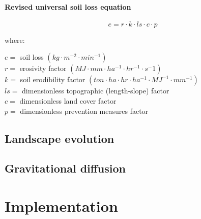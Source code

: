 \documentclass[final,3p,times,twocolumn]{elsarticle}
\begin{document}
\paragraph{Revised universal soil loss equation}
%
\begin{equation}
\label{eq:rusle}
{e = r \cdot k \cdot ls \cdot c \cdot p}
\end{equation}

\noindent
where: 

\noindent %
$e =$ soil loss $(kg \cdot m^{-2} \cdot min^{-1})$\\
$r =$ erosivity factor $(MJ \cdot mm \cdot ha^{-1} \cdot hr^{-1} \cdot  s{^-1})$\\
$k =$ soil erodibility factor $(ton \cdot ha \cdot hr \cdot ha^{-1} \cdot MJ^{-1} \cdot mm^{-1})$\\
$ls =$ dimensionless topographic (length-slope) factor\\
$c =$ dimensionless land cover factor\\
$p =$ dimensionless prevention measures factor\\
\vspace{1em}





\subsection{Landscape evolution}
\subsection{Gravitational diffusion}

\clearpage
\section{Implementation}

\end{document}
